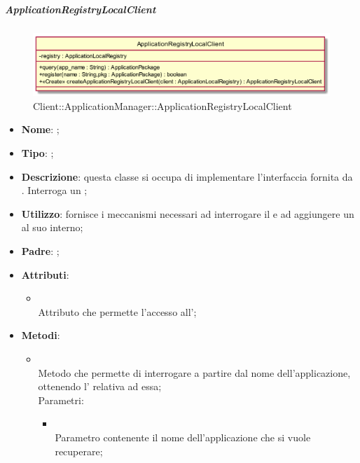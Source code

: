\hypertarget{ApplicationRegistryLocalClient_label}{\subparagraph{ApplicationRegistryLocalClient}}
\begin{figure}[h]
	\centering
	\includegraphics[width=\textwidth,height=\textheight,keepaspectratio]{images/ClassApplicationRegistryLocalClient.png}
	\caption{Client::ApplicationManager::ApplicationRegistryLocalClient}
\end{figure}
\begin{itemize}
	\item \textbf{Nome}: ;
	\item \textbf{Tipo}: ;
	\item \textbf{Descrizione}: questa classe si occupa di implementare l'interfaccia fornita da \\ . Interroga un ;
	\item \textbf{Utilizzo}: fornisce i meccanismi necessari ad interrogare il  e ad aggiungere un  al suo interno;
	\item \textbf{Padre}: ;
	\item \textbf{Attributi}:
	\begin{itemize}
		\item[]  \\
		Attributo che permette l'accesso all';
	\end{itemize}
	\item \textbf{Metodi}:
	\begin{itemize}
		\item[]  \\		Metodo che permette di interrogare  a partire dal nome dell'applicazione, ottenendo l' relativa ad essa;\\
		Parametri:
		\begin{itemize}
			\item {} \\
			Parametro contenente il nome dell'applicazione che si vuole recuperare;

\end{itemize}
\end{itemize}
\end{itemize}
